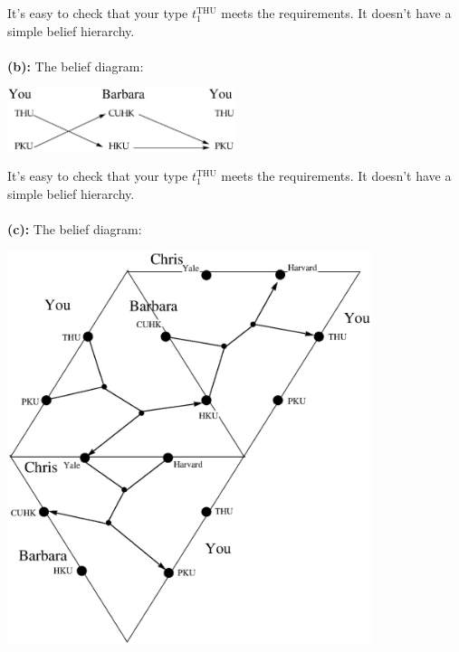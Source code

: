 \documentclass{article}
\begin{document}
\begin{description}

    It's easy to check that your type $t_1^{\text{THU}}$ meets the requirements. It doesn't have a simple belief hierarchy. \\\\
    {\bf (b):}
    The belief diagram:
    \begin{center}
                    \includegraphics[angle=0, width=0.5\textwidth]{ECON3160A3P2}\\
    \end{center}
    It's easy to check that your type $t_1^{\text{THU}}$ meets the requirements. It doesn't have a simple belief hierarchy. \\\\
    {\bf (c):}
    The belief diagram:
    \begin{center}
                    \includegraphics[angle=0, width=0.8\textwidth]{ECON3160A3P3}\\
    \end{center}

\end{description}
\end{document}
